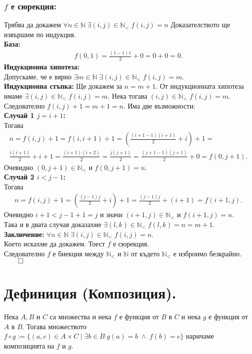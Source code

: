 \documentclass[a4paper, 12pt, oneside]{article}
\newcommand{\N}{\mathbb{N}}
\newcommand{\LN}{\N_<}
\begin{document}
\subsubsection*{\(f\) е сюрекция:}
Трябва да докажем \(\forall n \in \N \; \exists (i, j) \in \LN \; f(i, j) = n\)
Доказателството ще извършим по индукция. \\
\textbf{База:} \\
\begin{align*}
    f(0, 1) = \displaystyle\frac{(1 - 1)1}{2} + 0 = 0 + 0 = 0.
\end{align*}
\textbf{Индукционна хипотеза:} \\
Допускаме, че е вярно \(\exists m \in \N \; \exists (i, j) \in \LN \; f(i, j) = m\). \\
\textbf{Индукционна стъпка:}
Ще докажем за \(n = m + 1\). От индукционната хипотеза имаме \(\exists (i, j) \in \LN \; f(i, j) = m\).
Нека тогава \((i, j) \in \LN \; f(i, j) = m\). Следователно \(f(i, j) + 1 = m + 1 = n\).
Има две възможности: \\
\textbf{Случай 1 \(j = i + 1\):} \\
Тогава
\begin{align*}
    n = f(i, j) + 1 = f(i, i + 1) + 1 = \left(\displaystyle\frac{(i + 1 - 1)(i + 1)}{2} + i\right) + 1 = \\
    \displaystyle\frac{i(i + 1)}{2} + i + 1 = \displaystyle\frac{(i + 1)(i + 2)}{2} = \displaystyle\frac{j(j + 1)}{2} = \displaystyle\frac{(j + 1 - 1)(j + 1)}{2} + 0 = f(0, j + 1).
\end{align*}
Очевидно \((0, j + 1) \in \LN\) и \(f(0, j + 1) = n\). \\
\textbf{Случай 2 \(i < j - 1\):} \\
Тогава
\begin{align*}
    n = f(i, j) + 1 = \left(\displaystyle\frac{(j - 1)j}{2} + i\right) + 1 = \displaystyle\frac{(j - 1)j}{2} + (i + 1) = f(i + 1, j).
\end{align*}
Очевидно \(i + 1 < j - 1 + 1 = j\) и значи \((i + 1, j) \in \LN\) и \(f(i + 1, j) = n\). \\
Така и в двата случая доказахме \(\exists (l, k) \in \LN \; f(l, k) = n = m + 1\). \\
\textbf{Заключение:}
\(\forall n \in \N \; \exists (i, j) \in \LN \; f(i, j) = n\). \\
Което искахме да докажем. Тоест \(f\) е сюрекция. \\
Следователно \(f\) е биекция между \(\LN\) и \(\N\) от където \(\LN\) е изброимо безкрайно. \(\qed\)
\section*{Дефиниция (Композиция).}
Нека \(A, B\) и \(C\) са множества
и нека \(f\) е функция от \(B\) в \(C\)
и нека \(g\) е функция от \(A\) в \(B\).
Тогава множеството \(f \circ g := \{(a, c) \in A \times C \; | \; \exists b \in B \; g(a) = b \; \land \; f(b) = c\}\)
наричаме композицията на \(f\) и \(g\).
\end{document}
